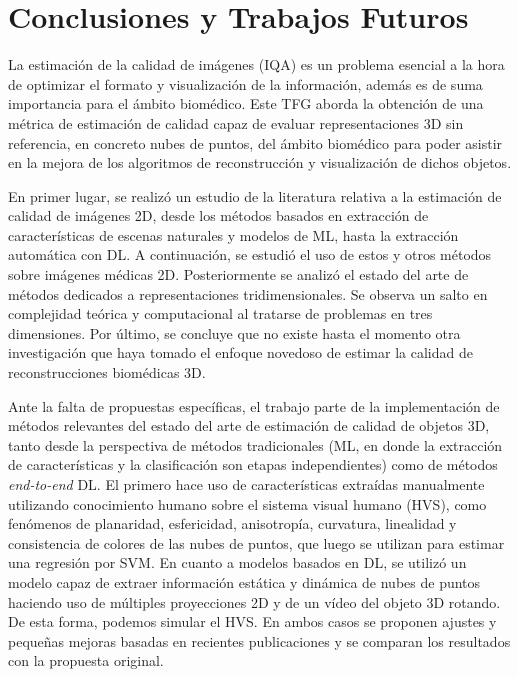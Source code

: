 \chapter{Conclusiones y Trabajos Futuros}
La estimación de la calidad de imágenes (IQA) es un problema esencial a la hora 
de optimizar el formato y visualización de la información, además es de 
suma importancia para el ámbito biomédico. 
Este TFG aborda la obtención de una métrica de estimación de calidad capaz de evaluar 
representaciones 3D sin referencia, en concreto nubes de puntos, del ámbito biomédico para poder asistir 
en la mejora de los algoritmos de reconstrucción y visualización de dichos objetos. 

En primer lugar, se realizó un estudio de la literatura relativa a la estimación de calidad 
de imágenes 2D, desde los métodos basados en extracción de características de escenas naturales y modelos de ML, 
hasta la extracción automática con DL. 
A continuación, se estudió el uso de estos y otros métodos sobre imágenes médicas 2D.
Posteriormente se analizó el estado del arte de métodos dedicados a representaciones tridimensionales. 
Se observa un salto en complejidad teórica y computacional al tratarse de problemas 
en tres dimensiones. 
Por último, se concluye que no existe hasta el momento 
otra investigación que haya tomado el enfoque novedoso de estimar la calidad de 
reconstrucciones biomédicas 3D. 

Ante la falta de propuestas específicas, el trabajo parte de la implementación 
de métodos relevantes del estado del arte de estimación de calidad de objetos 3D, 
tanto desde la perspectiva de métodos tradicionales (ML, en donde la extracción 
de características y la clasificación son etapas independientes) como de métodos 
\emph{end-to-end} DL. El primero hace uso de características 
extraídas manualmente utilizando conocimiento humano sobre el sistema visual humano (HVS), 
como fenómenos de planaridad, esfericidad, anisotropía, curvatura, linealidad y consistencia de 
colores de las nubes de puntos, que luego se utilizan para estimar una regresión por 
SVM. En cuanto a modelos basados en DL, se utilizó un modelo capaz de extraer 
información estática y dinámica de nubes de puntos haciendo uso de múltiples 
proyecciones 2D y de un vídeo del objeto 3D rotando. De esta forma, podemos  
simular el HVS. En ambos casos se proponen ajustes y pequeñas mejoras basadas 
en recientes publicaciones y se comparan los resultados con la propuesta original. 


